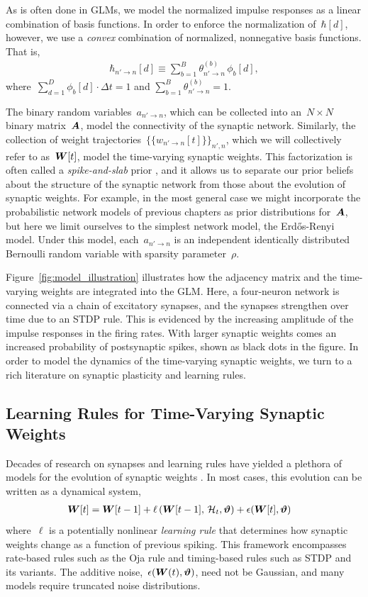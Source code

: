 As is often done in GLMs, we model the normalized impulse responses as
a linear combination of basis functions. In order to enforce the
normalization of~$\hbar[d]$, however, we use a \emph{convex}
combination of normalized, nonnegative basis functions. That is,
\begin{align*}
\hbar_{n' \to n}[d] \equiv \sum_{b=1}^B \theta_{n' \to n}^{(b)}\, \phi_b[d],
\end{align*}
where~${\sum_{d=1}^D \phi_b[d] \cdot \Delta t = 1}$ and
${\sum_{b=1}^B \theta_{n' \to n}^{(b)} = 1}$. 

The binary random variables~$a_{n' \to n}$, which can be collected
into an~${N\times N}$ binary matrix~$\boldsymbol{A}$, model the connectivity of
the synaptic network. Similarly, the collection of weight
trajectories~${\{\{w_{n' \to n}[t]\}\}_{n',n}}$, which we will
collectively refer to as~$\boldsymbol{W}[t]$, model the time-varying synaptic
weights. This factorization is often called a \emph{spike-and-slab}
prior \cite{Mitchell1988}, and it allows us to separate our prior
beliefs about the structure of the synaptic network from those about
the evolution of synaptic weights. For example, in the most general
case we might incorporate the probabilistic network models of previous chapters
 as prior distributions for~$\boldsymbol{A}$, but here we limit
ourselves to the simplest network model, the Erd\H{o}s-Renyi
model. Under this model, each~$a_{n' \to n}$ is an independent
identically distributed Bernoulli random variable with sparsity
parameter~$\rho$.

Figure~\ref{fig:model_illustration} illustrates how the adjacency
matrix and the time-varying weights are integrated into the GLM. Here,
a four-neuron network is connected via a chain of excitatory synapses,
and the synapses strengthen over time due to an STDP rule. This is
evidenced by the increasing amplitude of the impulse responses in the
firing rates.  With larger synaptic weights comes an increased
probability of postsynaptic spikes, shown as black dots in the
figure. In order to model the dynamics of the time-varying synaptic
weights, we turn to a rich literature on synaptic plasticity and
learning rules.

\subsection{Learning Rules for Time-Varying Synaptic Weights}
Decades of research on synapses and learning rules have yielded a
plethora of models for the evolution of synaptic weights
\cite{Caporale-2008}. In most cases, this evolution can be written as
a dynamical system,
\begin{align*} 
\boldsymbol{W}[t] &= \boldsymbol{W}[t-1] + \ell\left(\boldsymbol{W}[t-1], \, \mathcal{H}_t, \boldsymbol{\vartheta} \right) + \epsilon(\boldsymbol{W}[t], \boldsymbol{\vartheta})
\end{align*}
where~$\ell$ is a potentially nonlinear \emph{learning rule} that
determines how synaptic weights change as a function of previous
spiking. This framework encompasses rate-based rules such as the Oja
rule \cite{Oja-1982} and timing-based rules such as STDP and its
variants. The additive noise,~${\epsilon(\boldsymbol{W}(t), \boldsymbol{\vartheta})}$, need not be
Gaussian, and many models require truncated noise distributions.

